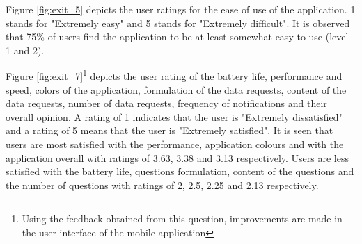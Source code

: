 Figure \ref{fig:exit_5} depicts the user ratings for the ease of use of the application. 1 stands for "Extremely easy" and 5 stands for "Extremely difficult". It is observed that 75\% of users find the application to be at least somewhat easy to use (level 1 and 2).

Figure \ref{fig:exit_7}\footnote{Using the feedback obtained from this question, improvements are made in the user interface of the mobile application} depicts the user rating of the battery life, performance and speed, colors of the application, formulation of the data requests, content of the data requests, number of data requests, frequency of notifications and their overall opinion. A rating of 1 indicates that the user is "Extremely dissatisfied" and a rating of 5 means that the user is "Extremely satisfied". It is seen that users are most satisfied with the performance, application colours and with the application overall with ratings of 3.63, 3.38 and 3.13 respectively. Users are less satisfied with the battery life, questions formulation, content of the questions and the number of questions with ratings of 2, 2.5, 2.25 and 2.13 respectively. 

